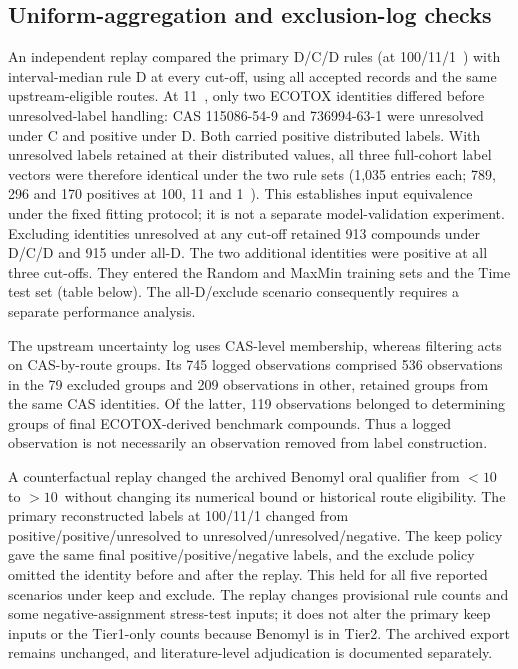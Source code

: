 \subsection*{Uniform-aggregation and exclusion-log checks}
An independent replay compared the primary D/C/D rules (at 100/11/1~\ugbee) with interval-median rule D at every cut-off, using all accepted records and the same upstream-eligible routes. At 11~\ugbee, only two ECOTOX identities differed before unresolved-label handling: CAS 115086-54-9 and 736994-63-1 were unresolved under C and positive under D. Both carried positive distributed labels. With unresolved labels retained at their distributed values, all three full-cohort label vectors were therefore identical under the two rule sets (1,035 entries each; 789, 296 and 170 positives at 100, 11 and 1~\ugbee). This establishes input equivalence under the fixed fitting protocol; it is not a separate model-validation experiment. Excluding identities unresolved at any cut-off retained 913 compounds under D/C/D and 915 under all-D. The two additional identities were positive at all three cut-offs. They entered the Random and MaxMin training sets and the Time test set (table below). The all-D/exclude scenario consequently requires a separate performance analysis.

The upstream uncertainty log uses CAS-level membership, whereas filtering acts on CAS-by-route groups. Its 745 logged observations comprised 536 observations in the 79 excluded groups and 209 observations in other, retained groups from the same CAS identities. Of the latter, 119 observations belonged to determining groups of final ECOTOX-derived benchmark compounds. Thus a logged observation is not necessarily an observation removed from label construction.

A counterfactual replay changed the archived Benomyl oral qualifier from $<10$ to $>10$~\ugbee without changing its numerical bound or historical route eligibility. The primary reconstructed labels at 100/11/1 changed from positive/positive/unresolved to unresolved/unresolved/negative. The keep policy gave the same final positive/positive/negative labels, and the exclude policy omitted the identity before and after the replay. This held for all five reported scenarios under keep and exclude. The replay changes provisional rule counts and some negative-assignment stress-test inputs; it does not alter the primary keep inputs or the Tier1-only counts because Benomyl is in Tier2. The archived export remains unchanged, and literature-level adjudication is documented separately.

